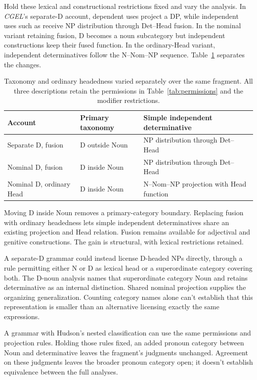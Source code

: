 \documentclass[12pt]{article}
\begin{document}
Hold these lexical and constructional restrictions fixed and vary the analysis. In \textit{CGEL}'s separate-D account, dependent uses project a DP, while independent uses such as  receive NP distribution through Det--Head fusion. In the nominal variant retaining fusion, D becomes a noun subcategory but independent constructions keep their fused function. In the ordinary-Head variant, independent determinatives follow the N--Nom--NP sequence. Table~\ref{tab:economy} separates the changes.

\begin{table}[tb]
\centering\small
\caption{Taxonomy and ordinary headedness varied separately over the same fragment. All three descriptions retain the permissions in Table~\ref{tab:permissions} and the modifier restrictions.}\label{tab:economy}
\begin{tabular}{>{\raggedright\arraybackslash}p{3.1cm}>{\raggedright\arraybackslash}p{3.9cm}>{\raggedright\arraybackslash}p{4.7cm}}
\toprule
Account & Primary taxonomy & Simple independent determinative \\
\midrule
Separate D, fusion & D outside Noun & NP distribution through Det--Head \\
Nominal D, fusion & D inside Noun & NP distribution through Det--Head \\
Nominal D, ordinary Head & D inside Noun & N--Nom--NP projection with Head function \\
\bottomrule
\end{tabular}
\end{table}

Moving D inside Noun removes a primary-category boundary. Replacing fusion with ordinary headedness lets simple independent determinatives share an existing projection and Head relation. Fusion remains available for adjectival and genitive constructions. The gain is structural, with lexical restrictions retained.

A separate-D grammar could instead license D-headed NPs directly, through a rule permitting either N or D as lexical head or a superordinate category covering both. The D-noun analysis names that superordinate category Noun and retains determinative as an internal distinction. Shared nominal projection supplies the organizing generalization. Counting category names alone can't establish that this representation is smaller than an alternative licensing exactly the same expressions.

A grammar with Hudson's nested classification can use the same permissions and projection rules. Holding those rules fixed, an added pronoun category between Noun and determinative leaves the fragment's judgments unchanged. Agreement on these judgments leaves the broader pronoun category open; it doesn't establish equivalence between the full analyses.
\end{document}
